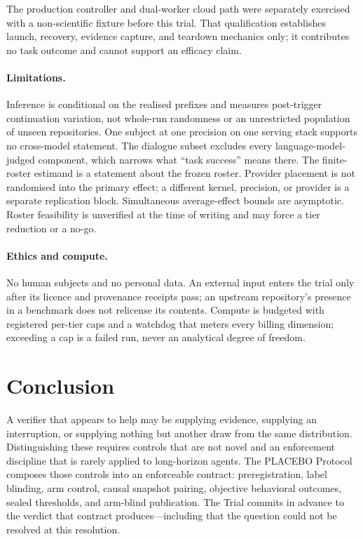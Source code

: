 \documentclass{article}
\begin{document}
The production controller and dual-worker cloud path were separately exercised
with a non-scientific fixture before this trial. That qualification establishes
launch, recovery, evidence capture, and teardown mechanics only; it contributes
no task outcome and cannot support an efficacy claim.

\paragraph{Limitations.}
Inference is conditional on the realised prefixes and measures post-trigger
continuation variation, not whole-run randomness or an unrestricted population
of unseen repositories. One subject at one precision on one serving stack
supports no cross-model statement. The dialogue subset excludes every
language-model-judged component, which narrows what ``task success'' means
there. The finite-roster estimand is a statement about the frozen roster.
Provider placement is not randomised into the primary effect; a different
kernel, precision, or provider is a separate replication block. Simultaneous
average-effect bounds are asymptotic. Roster feasibility is unverified at the
time of writing and may force a tier reduction or a no-go.

\paragraph{Ethics and compute.}
No human subjects and no personal data. An external input enters the trial only
after its licence and provenance receipts pass; an upstream repository's
presence in a benchmark does not relicense its contents. Compute is budgeted
with registered per-tier caps and a watchdog that meters every billing
dimension; exceeding a cap is a failed run, never an analytical degree of
freedom.

\section{Conclusion}

A verifier that appears to help may be supplying evidence, supplying an
interruption, or supplying nothing but another draw from the same distribution.
Distinguishing these requires controls that are not novel and an enforcement
discipline that is rarely applied to long-horizon agents. The PLACEBO Protocol
composes those controls into an enforceable contract: preregistration, label
blinding, arm control, causal snapshot pairing, objective behavioral outcomes,
sealed thresholds, and arm-blind publication. The Trial commits in advance to
the verdict that contract produces---including that the question could not be
resolved at this resolution.



\end{document}
